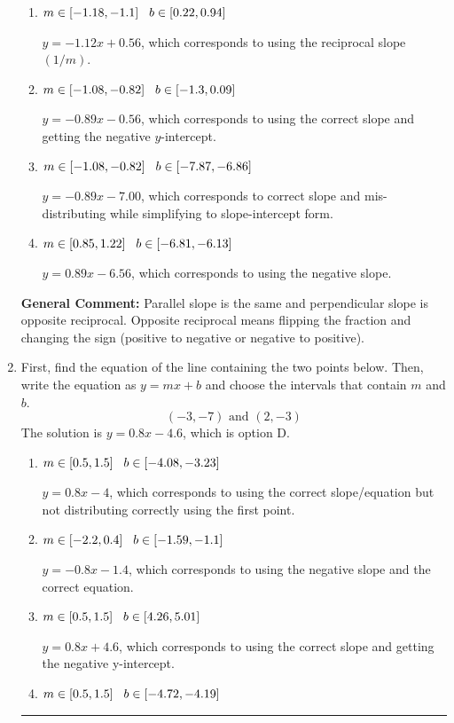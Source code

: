 \documentclass{extbook}[14pt]
\newcommand{\litem}[1]{\item #1

\rule{\textwidth}{0.4pt}}
\begin{document}
\begin{enumerate}
{\begin{enumerate}[label=\Alph*.]
* $y = -0.89x + 0.56$, which is the correct option.
\item \( m \in [-1.18, -1.1] \hspace*{3mm} b \in [0.22, 0.94] \)

 $y = -1.12x + 0.56$, which corresponds to using the reciprocal slope $(1/m)$.
\item \( m \in [-1.08, -0.82] \hspace*{3mm} b \in [-1.3, 0.09] \)

 $y = -0.89x - 0.56$, which corresponds to using the correct slope and getting the negative $y$-intercept.
\item \( m \in [-1.08, -0.82] \hspace*{3mm} b \in [-7.87, -6.86] \)

 $y = -0.89x - 7.00$, which corresponds to correct slope and mis-distributing while simplifying to slope-intercept form.
\item \( m \in [0.85, 1.22] \hspace*{3mm} b \in [-6.81, -6.13] \)

 $y = 0.89x - 6.56$, which corresponds to using the negative slope.
\end{enumerate}

\textbf{General Comment:} Parallel slope is the same and perpendicular slope is opposite reciprocal. Opposite reciprocal means flipping the fraction and changing the sign (positive to negative or negative to positive).
}
\litem{
First, find the equation of the line containing the two points below. Then, write the equation as $ y=mx+b $ and choose the intervals that contain $m$ and $b$.
\[ (-3, -7) \text{ and } (2, -3) \]
The solution is \( y = 0.8x -4.6 \), which is option D.\begin{enumerate}[label=\Alph*.]
\item \( m \in [0.5, 1.5] \hspace*{3mm} b \in [-4.08, -3.23] \)

 $y = 0.8x -4$, which corresponds to using the correct slope/equation but not distributing correctly using the first point.
\item \( m \in [-2.2, 0.4] \hspace*{3mm} b \in [-1.59, -1.1] \)

 $y = -0.8x -1.4$, which corresponds to using the negative slope and the correct equation.
\item \( m \in [0.5, 1.5] \hspace*{3mm} b \in [4.26, 5.01] \)

 $y = 0.8x + 4.6$, which corresponds to using the correct slope and getting the negative y-intercept.
\item \( m \in [0.5, 1.5] \hspace*{3mm} b \in [-4.72, -4.19] \)


\end{enumerate}}
\end{enumerate}
\end{document}
